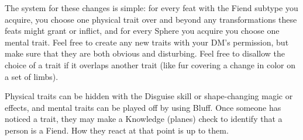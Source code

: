 The system for these changes is simple: for every feat with the Fiend subtype you acquire, you choose one physical trait over and beyond any transformations these feats might grant or inflict, and for every Sphere you acquire you choose one mental trait. Feel free to create any new traits with your DM's permission, but make sure that they are both obvious and disturbing. Feel free to disallow the choice of a trait if it overlaps another trait (like fur covering a change in color on a set of limbs).

Physical traits can be hidden with the Disguise skill or shape-changing magic or effects, and mental traits can be played off by using Bluff. Once someone has noticed a trait, they may make a Knowledge (planes) check to identify that a person is a Fiend. How they react at that point is up to them.

